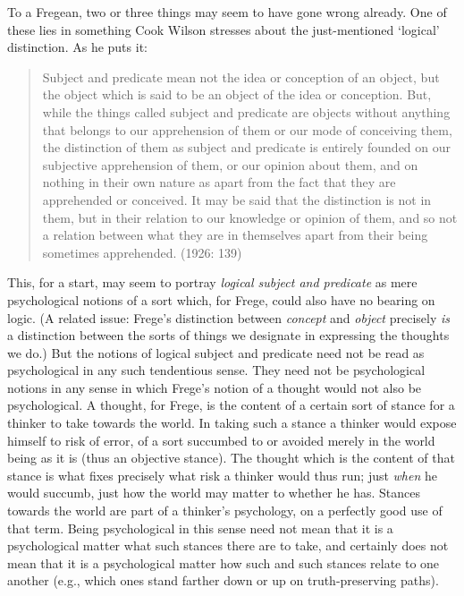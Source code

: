 To a Fregean, two or three things may seem to have gone wrong already. One of these lies in something Cook Wilson stresses about the just-mentioned `logical' distinction. As he puts it:
\begin{quote}
	Subject and predicate mean not the idea or conception of an object, but the object which is said to be an object of the idea or conception. But, while the things called subject and predicate are objects without anything that belongs to our apprehension of them or our mode of conceiving them, the distinction of them as subject and predicate is entirely founded on our subjective apprehension of them, or our opinion about them, and on nothing in their own nature as apart from the fact that they are apprehended or conceived. It may be said that the distinction is not in them, but in their relation to our knowledge or opinion of them, and so not a relation between what they are in themselves apart from their being sometimes apprehended. (1926: 139)
\end{quote}
This, for a start, may seem to portray \emph{logical subject and predicate} as mere psychological notions of a sort which, for Frege, could also have no bearing on logic. (A related issue: Frege’s distinction between \emph{concept} and \emph{object} precisely \emph{is} a distinction between the sorts of things we designate in expressing the thoughts we do.) But the notions of logical subject and predicate need not be read as psychological in any such tendentious sense. They need not be psychological notions in any sense in which Frege’s notion of a thought would not also be psychological. A thought, for Frege, is the content of a certain sort of stance for a thinker to take towards the world. In taking such a stance a thinker would expose himself to risk of error, of a sort succumbed to or avoided merely in the world being as it is (thus an objective stance). The thought which is the content of that stance is what fixes precisely what risk a thinker would thus run; just \emph{when} he would succumb, just how the world may matter to whether he has. Stances towards the world are part of a thinker’s psychology, on a perfectly good use of that term. Being psychological in this sense need not mean that it is a psychological matter what such stances there are to take, and certainly does not mean that it is a psychological matter how such and such stances relate to one another (e.g., which ones stand farther down or up on truth-preserving paths).

